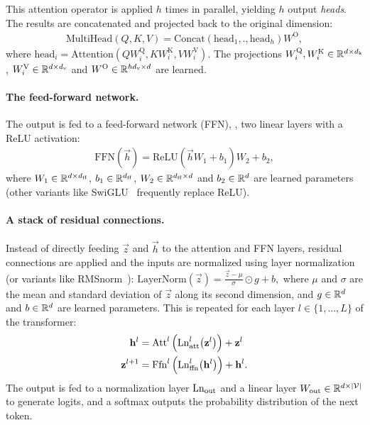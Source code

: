 This attention operator is applied $h$ times in parallel, yielding $h$ output \emph{heads}.
The results are concatenated and projected back to the original dimension:
\vspace{-0.1cm}
\begin{align}\label{chap7/eq:multihead}
\mathrm{MultiHead}(Q,K,V) = \mathrm{Concat}(\mathrm{head}_1,., \mathrm{head}_h)W^\mathrm{O},
\end{align}
where $\mathrm{head}_i = \mathrm{Attention}(QW_i^\mathrm{Q}, KW_i^\mathrm{K}, VW_i^\mathrm{V})$. 
The projections $W_i^\mathrm{Q}, W_i^\mathrm{K} \in \mathbb{R}^{d \times d_\mathrm{k}}$, $W_i^\mathrm{V} \in \mathbb{R}^{d \times d_\mathrm{v}}$ and $W^\mathrm{O} \in \mathbb{R}^{hd_\mathrm{v} \times d}$ are learned.

\paragraph*{The feed-forward network.}
The output is fed to a feed-forward network (FFN), \eg, two linear layers with a ReLU activation:
\vspace{-0.1cm}
\begin{align}
\mathrm{FFN}(\vec{h}) = \mathrm{ReLU}(\vec{h}W_1 + b_1)W_2 + b_2,
\end{align}
where $W_1 \in \mathbb{R}^{d \times d_\mathrm{ff}}$, $b_1 \in \mathbb{R}^{d_\mathrm{ff}}$, $W_2 \in \mathbb{R}^{d_\mathrm{ff} \times d}$ and $b_2 \in \mathbb{R}^{d}$ are learned parameters (other variants like SwiGLU~\citep{shazeer2020glu} frequently replace ReLU).

\paragraph*{A stack of residual connections.}
Instead of directly feeding $\vec{z}$ and $\vec{h}$ to the attention and FFN layers, residual connections are applied and the inputs are normalized using layer normalization~\citep{ba2016layer} (or variants like RMSnorm~\citep{zhang2019root}):
$\label{chap7/eq:layernorm}
\mathrm{LayerNorm}(\vec{z}) = \frac{\vec{z} - \mu}{\sigma} \odot g + b,
$
where $\mu$ and $\sigma$ are the mean and standard deviation of $\vec{z}$ along its second dimension, and $g\in \mathbb{R}^d$ and $b\in \mathbb{R}^d$ are learned parameters.
This is repeated for each layer $l\in \{1, ..., L\}$ of the transformer:
\vspace{-0.1cm}
\begin{align}
\mathbf{h}^{l} &= \mathrm{Att}^{l} \left( \mathrm{Ln}_{\mathrm{att}}^{l} \big( \mathbf{z}^{l} \big) \right) + \mathbf{z}^{l} \\
\mathbf{z}^{l+1} &= \mathrm{Ffn}^{l} \left( \mathrm{Ln}_{\mathrm{ffn}}^{l} \big( \mathbf{h}^{l} \big) \right) + \mathbf{h}^{l}.
\end{align}
The output is fed to a normalization layer $\mathrm{Ln}_{\mathrm{out}}$ and a linear layer $W_\mathrm{out} \in \mathbb{R}^{d \times |\mathcal V|}$ to generate logits, and a softmax outputs the probability distribution of the next token.

